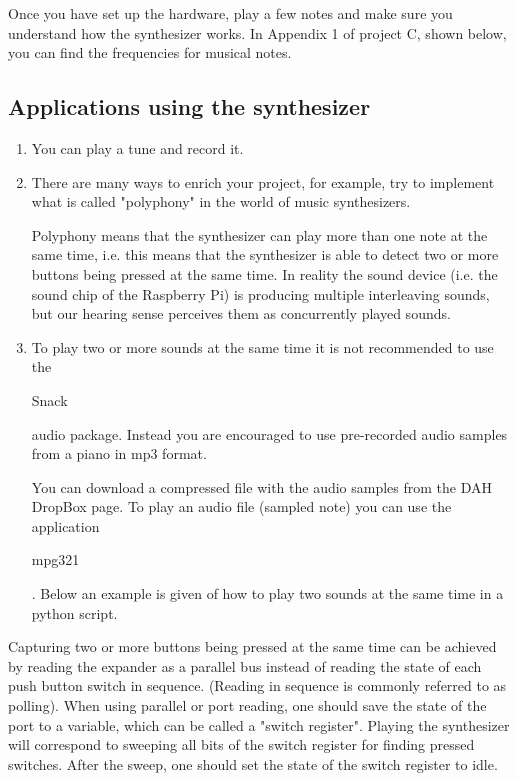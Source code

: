 Once you have set up the hardware, play a few notes and make sure you understand how the synthesizer works. In Appendix 1 of project C, shown below, you can find the frequencies for musical notes.


\subsection{Applications using the synthesizer}

\begin{enumerate}
\item	You can play a tune and record it.


\item There are many ways to enrich your project, for example, try to implement what is called "polyphony" in the world of music synthesizers.

Polyphony means that the synthesizer can play more than one note at the same time, i.e. this means that the synthesizer is able to detect two or more buttons being pressed at the same time. In reality the sound device (i.e. the sound chip of the Raspberry Pi) is producing multiple interleaving sounds, but our hearing sense perceives them as concurrently played sounds.

\item To play two or more sounds at the same time it is not recommended to use the \begin{tt}Snack\end{tt} audio package. Instead you are encouraged to use pre-recorded audio samples from a piano in mp3 format. 

You can download a compressed file with the audio samples from the DAH DropBox page. To play an audio file (sampled note) you can use the application \begin{tt}mpg321\end{tt}. Below an example is given of how to play two sounds at the same time in a python script.\\


\vspace*{-0.5cm}
\end{enumerate}

Capturing two or more buttons being pressed at the same time can be achieved by reading the expander as a parallel bus instead of reading the state of each push button switch in sequence. (Reading in sequence is commonly referred to as polling). When using parallel or port reading, one should save the state of the port to a variable, which can be called a "switch register". Playing the synthesizer will correspond to sweeping all bits of the switch register for finding pressed switches. After the sweep, one should set the state of the switch register to idle.
 
